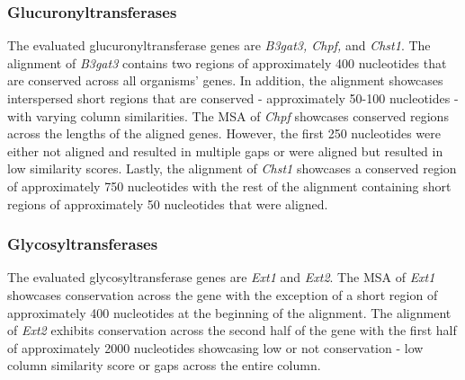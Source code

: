 \documentclass{article}
\begin{document}
\subsubsection{Glucuronyltransferases}
The evaluated glucuronyltransferase genes are \textit{B3gat3, Chpf,} and \textit{Chst1}. The alignment of \textit{B3gat3} contains two regions of approximately 400 nucleotides that are conserved across all organisms' genes. In addition, the alignment showcases interspersed short regions that are conserved - approximately 50-100 nucleotides - with varying column similarities. The MSA of \textit{Chpf} showcases conserved regions across the lengths of the aligned genes. However, the first 250 nucleotides were either not aligned and resulted in multiple gaps or were aligned but resulted in low similarity scores. Lastly, the alignment of \textit{Chst1} showcases a conserved region of approximately 750 nucleotides with the rest of the alignment containing short regions of approximately 50 nucleotides that were aligned.

\subsubsection{Glycosyltransferases}
The evaluated glycosyltransferase genes are \textit{Ext1} and \textit{Ext2}. The MSA of \textit{Ext1} showcases conservation across the gene with the exception of a short region of approximately 400 nucleotides at the beginning of the alignment. The alignment of \textit{Ext2} exhibits conservation across the second half of the gene with the first half of approximately 2000 nucleotides showcasing low or not conservation - low column similarity score or gaps across the entire column.
\end{document}
